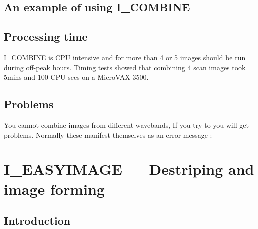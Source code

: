 \documentclass[nolof,noabs,11pt]{starlink}
\begin{document}
\subsection {An example of using I\_COMBINE}


\subsection {Processing time}

I\_COMBINE is CPU intensive and for more than 4 or 5 images should be run
during off-peak hours. Timing tests showed that combining 4 scan images
took 5mins and 100 CPU secs on a MicroVAX 3500.

\subsection {Problems}

You cannot combine images from different wavebands, If you try to you will get
problems. Normally these manifest themselves as an error message :-
\begin{terminalv}
\end{terminalv}
\pagebreak

\section{I\_EASYIMAGE --- Destriping and image forming}

\subsection {Introduction}
\end{document}
